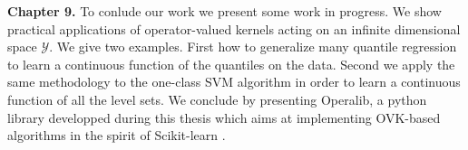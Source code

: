 \textbf{Chapter 9.}
To conlude our work we present some work in progress. We show practical
applications of operator-valued kernels acting on an infinite dimensional space
$\mathcal{Y}$. We give two examples. First how to generalize many quantile
regression to learn a continuous function of the quantiles on the data. Second
we apply the same methodology to the one-class SVM algorithm in order to learn
a continuous function of all the level sets. We conclude by presenting
Operalib, a python library developped during this thesis which aims at
implementing \acs{OVK}-based algorithms in the spirit of Scikit-learn
\citep{pedregosa2011scikit}.


